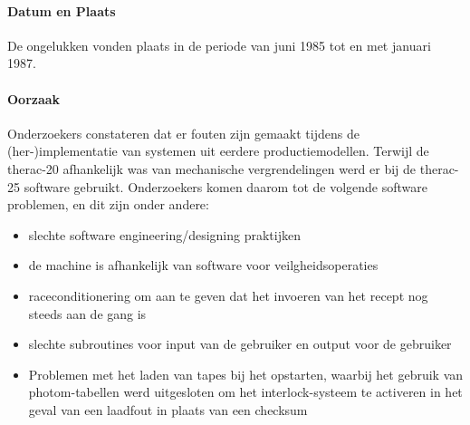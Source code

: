 \documentclass{article}
\begin{document}
	\paragraph{Datum en Plaats}
	De ongelukken vonden plaats in de periode van juni 1985 tot en met januari 1987.
	\paragraph{Oorzaak}
	\newline \indent  
	Onderzoekers constateren dat er fouten zijn gemaakt tijdens de (her-)implementatie van systemen uit eerdere productiemodellen.  
	Terwijl de therac-20 afhankelijk was van mechanische vergrendelingen werd er bij de therac-25 software gebruikt.
	Onderzoekers komen daarom tot de volgende software problemen, en dit zijn onder andere:
	\begin{itemize}
		\item slechte software engineering/designing praktijken
		\item de machine is   afhankelijk  van software voor veilgheidsoperaties
		\item  raceconditionering om aan te geven dat het invoeren van het recept nog steeds aan de gang is
		\item  slechte subroutines voor input van de gebruiker en output voor de gebruiker
		\item  Problemen met het laden van tapes bij het opstarten, waarbij het gebruik van photom-tabellen werd uitgesloten om het interlock-systeem te activeren in het geval van een laadfout in plaats van een checksum
	\end{itemize}
	
\end{document}
